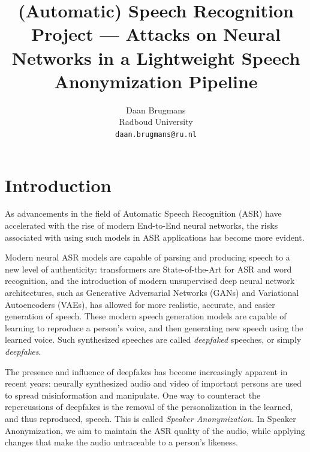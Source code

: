 \documentclass[11pt]{article}
\title{(Automatic) Speech Recognition Project --- Attacks on Neural Networks in a Lightweight Speech Anonymization Pipeline}
\author{Daan Brugmans \\
  Radboud University\\
  \texttt{daan.brugmans@ru.nl}
}
\begin{document}
\maketitle
        


\begin{abstract}
  
\end{abstract}

\section{Introduction}
As advancements in the field of Automatic Speech Recognition (ASR) have accelerated with the rise of modern End-to-End neural networks, the risks associated with using such models in ASR applications has become more evident.

Modern neural ASR models are capable of parsing and producing speech to a new level of authenticity: transformers are State-of-the-Art for ASR and word recognition, and the introduction of modern unsupervised deep neural network architectures, such as Generative Adversarial Networks (GANs) and Variational Autoencoders (VAEs), has allowed for more realistic, accurate, and easier generation of speech.
These modern speech generation models are capable of learning to reproduce a person's voice, and then generating new speech using the learned voice.
Such synthesized speeches are called \textit{deepfaked} speeches, or simply \textit{deepfakes}.

The presence and influence of deepfakes has become increasingly apparent in recent years: neurally synthesized audio and video of important persons are used to spread misinformation and manipulate.
One way to counteract the repercussions of deepfakes is the removal of the personalization in the learned, and thus reproduced, speech.
This is called \textit{Speaker Anonymization}.
In Speaker Anonymization, we aim to maintain the ASR quality of the audio, while applying changes that make the audio untraceable to a person's likeness.
\end{document}
